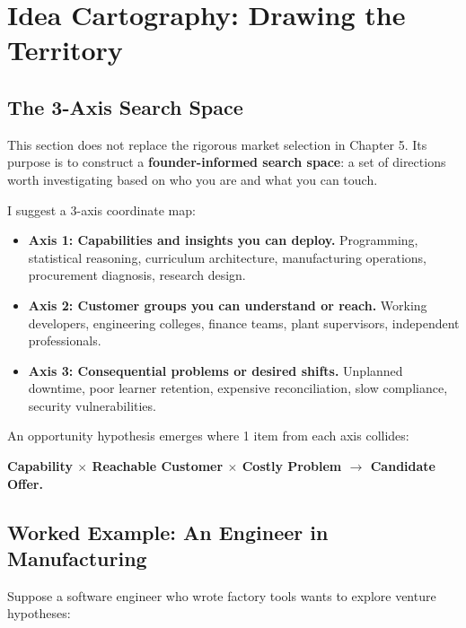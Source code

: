 \section{Idea Cartography: Drawing the Territory}

\subsection{The 3-Axis Search Space}

This section does not replace the rigorous market selection in Chapter 5. Its purpose is to construct a \textbf{founder-informed search space}: a set of directions worth investigating based on who you are and what you can touch.

I suggest a 3-axis coordinate map:

\begin{itemize}[leftmargin=11pt,itemsep=1.5pt,topsep=1.5pt,parsep=0pt]
  \item \textbf{Axis 1: Capabilities and insights you can deploy.} Programming, statistical reasoning, curriculum architecture, manufacturing operations, procurement diagnosis, research design.
  \item \textbf{Axis 2: Customer groups you can understand or reach.} Working developers, engineering colleges, finance teams, plant supervisors, independent professionals.
  \item \textbf{Axis 3: Consequential problems or desired shifts.} Unplanned downtime, poor learner retention, expensive reconciliation, slow compliance, security vulnerabilities.
\end{itemize}

An opportunity hypothesis emerges where 1 item from each axis collides:

\begin{center}
\textbf{Capability $\times$ Reachable Customer $\times$ Costly Problem $\rightarrow$ Candidate Offer.}
\end{center}

\subsection{Worked Example: An Engineer in Manufacturing}

Suppose a software engineer who wrote factory tools wants to explore venture hypotheses:

